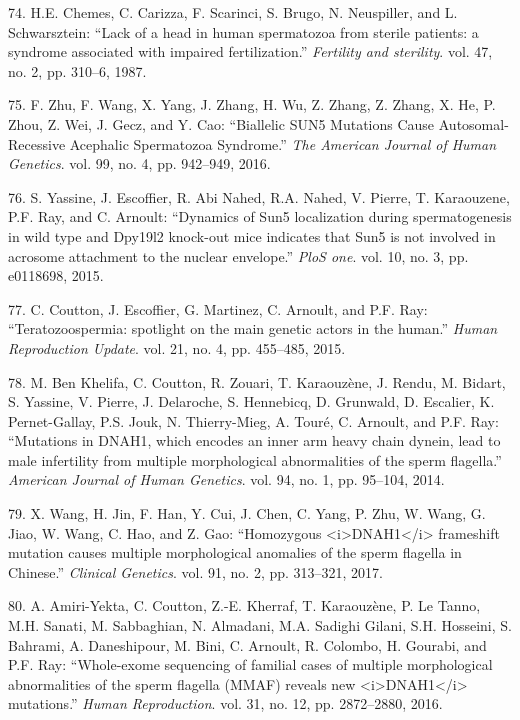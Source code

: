 \documentclass[12pt,twoside]{reedthesis}
\theoremstyle{definition}
\theoremstyle{definition}
\theoremstyle{remark}
\begin{document}
  \hypertarget{ref-Chemes1987}{}
  74. H.E. Chemes, C. Carizza, F. Scarinci, S. Brugo, N. Neuspiller, and
  L. Schwarsztein: ``Lack of a head in human spermatozoa from sterile
  patients: a syndrome associated with impaired fertilization.''
  \emph{Fertility and sterility}. vol. 47, no. 2, pp. 310--6, 1987.
  
  \hypertarget{ref-Zhu2016}{}
  75. F. Zhu, F. Wang, X. Yang, J. Zhang, H. Wu, Z. Zhang, Z. Zhang, X.
  He, P. Zhou, Z. Wei, J. Gecz, and Y. Cao: ``Biallelic SUN5 Mutations
  Cause Autosomal-Recessive Acephalic Spermatozoa Syndrome.'' \emph{The
  American Journal of Human Genetics}. vol. 99, no. 4, pp. 942--949, 2016.
  
  \hypertarget{ref-Yassine2015}{}
  76. S. Yassine, J. Escoffier, R. Abi Nahed, R.A. Nahed, V. Pierre, T.
  Karaouzene, P.F. Ray, and C. Arnoult: ``Dynamics of Sun5 localization
  during spermatogenesis in wild type and Dpy19l2 knock-out mice indicates
  that Sun5 is not involved in acrosome attachment to the nuclear
  envelope.'' \emph{PloS one}. vol. 10, no. 3, pp. e0118698, 2015.
  
  \hypertarget{ref-Coutton2015}{}
  77. C. Coutton, J. Escoffier, G. Martinez, C. Arnoult, and P.F. Ray:
  ``Teratozoospermia: spotlight on the main genetic actors in the human.''
  \emph{Human Reproduction Update}. vol. 21, no. 4, pp. 455--485, 2015.
  
  \hypertarget{ref-BenKhelifa2014}{}
  78. M. Ben Khelifa, C. Coutton, R. Zouari, T. Karaouzène, J. Rendu, M.
  Bidart, S. Yassine, V. Pierre, J. Delaroche, S. Hennebicq, D. Grunwald,
  D. Escalier, K. Pernet-Gallay, P.S. Jouk, N. Thierry-Mieg, A. Touré, C.
  Arnoult, and P.F. Ray: ``Mutations in DNAH1, which encodes an inner arm
  heavy chain dynein, lead to male infertility from multiple morphological
  abnormalities of the sperm flagella.'' \emph{American Journal of Human
  Genetics}. vol. 94, no. 1, pp. 95--104, 2014.
  
  \hypertarget{ref-Wang2017}{}
  79. X. Wang, H. Jin, F. Han, Y. Cui, J. Chen, C. Yang, P. Zhu, W. Wang,
  G. Jiao, W. Wang, C. Hao, and Z. Gao: ``Homozygous
  \textless{}i\textgreater{}DNAH1\textless{}/i\textgreater{} frameshift
  mutation causes multiple morphological anomalies of the sperm flagella
  in Chinese.'' \emph{Clinical Genetics}. vol. 91, no. 2, pp. 313--321,
  2017.
  
  \hypertarget{ref-Amiri-Yekta2016}{}
  80. A. Amiri-Yekta, C. Coutton, Z.-E. Kherraf, T. Karaouzène, P. Le
  Tanno, M.H. Sanati, M. Sabbaghian, N. Almadani, M.A. Sadighi Gilani,
  S.H. Hosseini, S. Bahrami, A. Daneshipour, M. Bini, C. Arnoult, R.
  Colombo, H. Gourabi, and P.F. Ray: ``Whole-exome sequencing of familial
  cases of multiple morphological abnormalities of the sperm flagella
  (MMAF) reveals new
  \textless{}i\textgreater{}DNAH1\textless{}/i\textgreater{} mutations.''
  \emph{Human Reproduction}. vol. 31, no. 12, pp. 2872--2880, 2016.
  
\end{document}
